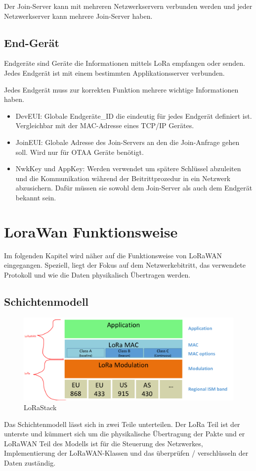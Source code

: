 \documentclass[a4paper,12pt]{article}
\begin{document}
            Der Join-Server kann mit mehreren Netzwerkservern verbunden werden und jeder Netzwerkserver kann mehrere 
            Join-Server haben.
        \subsection{End-Gerät}
            Endgeräte sind Geräte die Informationen mittels LoRa empfangen oder senden. Jedes Endgerät ist mit einem 
            bestimmten Applikationsserver verbunden.

            Jedes Endgerät muss zur korrekten Funktion mehrere wichtige Informationen haben.
            \begin{itemize}
                \item DevEUI: Globale Endgeräte\_ID die eindeutig für jedes Endgerät definiert ist. Vergleichbar 
                mit der MAC-Adresse eines TCP/IP Gerätes.
                \item JoinEUI: Globale Adresse des Join-Servers an den die Join-Anfrage gehen soll. Wird nur für OTAA Geräte
                benötigt.
                \item NwkKey und AppKey: Werden verwendet um spätere Schlüssel abzuleiten und die Kommunikation während
                der Beitrittprozedur in ein Netzwerk abzusichern. Dafür müssen sie sowohl dem Join-Server als auch dem
                Endgerät bekannt sein.
            \end{itemize}
            \cite[S.47 ff.]{LoRaSpec}

    \section{LoraWan Funktionsweise}
        Im folgenden Kapitel wird näher auf die Funktionsweise von LoRaWAN eingegangen. Speziell, liegt der Fokus auf
        dem Netzwerkebitritt, das verwendete Protokoll und wie die Daten physikalisch Übertragen werden.
        \subsection{Schichtenmodell}
            \begin{figure}
                \includegraphics[width=\textwidth]{LoraLayer}
                \caption{LoRaStack \cite[S.7]{WhatIsLoRa}}
            \end{figure}
            Das Schichtenmodell lässt sich in zwei Teile unterteilen. Der LoRa Teil ist der unterste und kümmert sich 
            um die physikalische Übertragung der Pakte und er LoRaWAN Teil des Modells ist für die Steuerung des 
            Netzwerkes, Implementierung der LoRaWAN-Klassen und das überprüfen / verschlüsseln der Daten zuständig.
\end{document}
